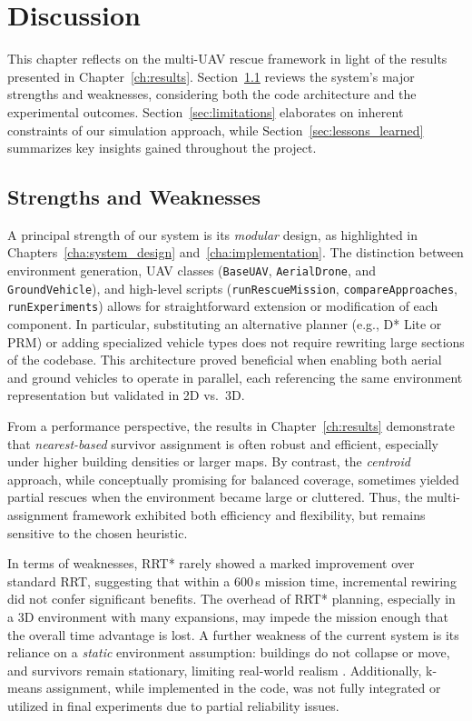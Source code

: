 \documentclass[12pt,a4paper]{report}
\begin{document}
\chapter{Discussion}
\label{ch:discussion}

This chapter reflects on the multi-UAV rescue framework in light of the results presented
in Chapter~\ref{ch:results}. Section~\ref{sec:strengths_weaknesses} reviews the system's
major strengths and weaknesses, considering both the code architecture and the
experimental outcomes. Section~\ref{sec:limitations} elaborates on inherent constraints
of our simulation approach, while Section~\ref{sec:lessons_learned} summarizes key
insights gained throughout the project.

\section{Strengths and Weaknesses}
\label{sec:strengths_weaknesses}
A principal strength of our system is its \emph{modular} design, as highlighted in
Chapters~\ref{cha:system_design} and~\ref{cha:implementation}. The distinction between
environment generation, UAV classes (\texttt{BaseUAV}, \texttt{AerialDrone}, and
\texttt{GroundVehicle}), and high-level scripts (\texttt{runRescueMission},
\texttt{compareApproaches}, \texttt{runExperiments}) allows for straightforward
extension or modification of each component. In particular, substituting an alternative
planner (e.g., D* Lite or PRM) or adding specialized vehicle types does not require
rewriting large sections of the codebase. This architecture proved beneficial when
enabling both aerial and ground vehicles to operate in parallel, each referencing the
same environment representation but validated in 2D vs.\ 3D.

From a performance perspective, the results in Chapter~\ref{ch:results} demonstrate
that \emph{nearest-based} survivor assignment is often robust and efficient, especially
under higher building densities or larger maps. By contrast, the \emph{centroid} approach,
while conceptually promising for balanced coverage, sometimes yielded partial rescues
when the environment became large or cluttered. Thus, the multi-assignment framework
exhibited both efficiency and flexibility, but remains sensitive to the chosen heuristic.

In terms of weaknesses, RRT* rarely showed a marked improvement over standard RRT,
suggesting that within a 600\,s mission time, incremental rewiring did not confer
significant benefits. The overhead of RRT* planning, especially in a 3D environment
with many expansions, may impede the mission enough that the overall time advantage
is lost. A further weakness of the current system is its reliance on a \emph{static}
environment assumption: buildings do not collapse or move, and survivors remain
stationary, limiting real-world realism \cite{Auclair2021CollapseRisk,Oleynikova2018ReplanDynamic}. Additionally, k-means assignment, while
implemented in the code, was not fully integrated or utilized in final experiments due 
to partial reliability issues.
\end{document}
